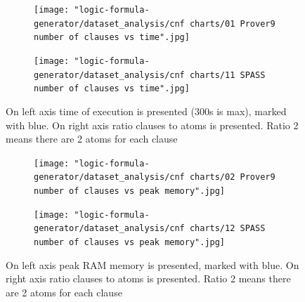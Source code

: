 \begin{figure}[ht]
\centering
  \begin{subfigure}{0.8\textwidth}
\centering
  \texttt{[image: "logic-formula-generator/dataset\_analysis/cnf charts/01 Prover9 number of clauses vs time".jpg]}
  \label{pic:benchmark_results}
  \end{subfigure}

  \begin{subfigure}{\textwidth}
\centering
  \texttt{[image: "logic-formula-generator/dataset\_analysis/cnf charts/11 SPASS number of clauses vs time".jpg]}
  \end{subfigure}
  \caption{On left axis time of execution is presented (300s is max), marked with blue. On right axis ratio clauses to atoms is presented. Ratio 2 means there are 2 atoms for each clause}
  \label{pic:SPASSProverNumberOfClauses}
\end{figure}

\begin{figure}[ht]
\centering
  \begin{subfigure}{0.8\textwidth}
\centering
  \texttt{[image: "logic-formula-generator/dataset\_analysis/cnf charts/02 Prover9 number of clauses vs peak memory".jpg]}
  \label{pic:benchmark_results}
  \end{subfigure}

  \begin{subfigure}{\textwidth}
\centering
\texttt{[image: "logic-formula-generator/dataset\_analysis/cnf charts/12 SPASS number of clauses vs peak memory".jpg]}
  \end{subfigure}
  \caption{On left axis peak RAM memory is presented, marked with blue. On right axis ratio clauses to atoms is presented. Ratio 2 means there are 2 atoms for each clause}
  \label{pic:SPASSProverMemory}
\end{figure}

